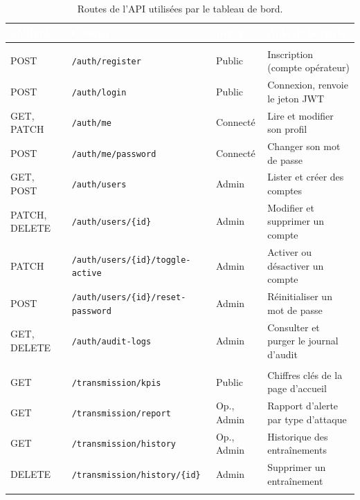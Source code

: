 \begin{table}[H]
\centering
\footnotesize
\renewcommand{\arraystretch}{1.35}
\setlength{\arrayrulewidth}{0.8pt}
\caption{Routes de l'API utilisées par le tableau de bord.}
\label{tab:api}
\begin{tabularx}{\textwidth}{@{}>{\raggedright\arraybackslash}p{1.5cm} >{\raggedright\arraybackslash}p{5.5cm} >{\centering\arraybackslash}p{1.9cm} >{\raggedright\arraybackslash}X@{}}
\rowcolor{thead}
\textcolor{white}{\textbf{Méthode}} & \textcolor{white}{\textbf{Chemin}} &
\textcolor{white}{\textbf{Accès}} & \textcolor{white}{\textbf{Rôle de la route}} \\
\hline
\multicolumn{4}{@{}l}{\textit{Module auth}} \\
POST & \texttt{/auth/register} & Public & Inscription (compte opérateur) \\
\rowcolor{trowa}
POST & \texttt{/auth/login} & Public & Connexion, renvoie le jeton JWT \\
GET, PATCH & \texttt{/auth/me} & Connecté & Lire et modifier son profil \\
\rowcolor{trowa}
POST & \texttt{/auth/me/password} & Connecté & Changer son mot de passe \\
GET, POST & \texttt{/auth/users} & Admin & Lister et créer des comptes \\
\rowcolor{trowa}
PATCH, DELETE & \texttt{/auth/users/\{id\}} & Admin & Modifier et supprimer un compte \\
PATCH & \texttt{/auth/users/\{id\}/toggle-active} & Admin & Activer ou désactiver un compte \\
\rowcolor{trowa}
POST & \texttt{/auth/users/\{id\}/reset-password} & Admin & Réinitialiser un mot de passe \\
GET, DELETE & \texttt{/auth/audit-logs} & Admin & Consulter et purger le journal d'audit \\
\multicolumn{4}{@{}l}{\textit{Module transmission (détection)}} \\
\rowcolor{trowa}
GET & \texttt{/transmission/kpis} & Public & Chiffres clés de la page d'accueil \\
GET & \texttt{/transmission/report} & Op., Admin & Rapport d'alerte par type d'attaque \\
\rowcolor{trowa}
GET & \texttt{/transmission/history} & Op., Admin & Historique des entraînements \\
DELETE & \texttt{/transmission/history/\{id\}} & Admin & Supprimer un entraînement \\
\rowcolor{trowa}

\end{tabularx}
\end{table}
